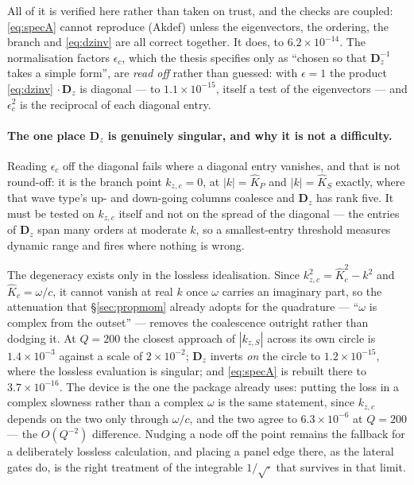 \documentclass[11pt,a4paper]{article}
\begin{document}
All of it is verified here rather than taken on trust, and the checks are
coupled: \eqref{eq:specA} cannot reproduce (Akdef) unless the
eigenvectors, the ordering, the branch and \eqref{eq:dzinv} are all correct
together.  It does, to $6.2\times10^{-14}$.  The normalisation factors
$\epsilon_c$, which the thesis specifies only as ``chosen so that
$\mathbf{D}_z^{-1}$ takes a simple form'', are \emph{read off} rather than
guessed: with $\epsilon=1$ the product \eqref{eq:dzinv}$\,\cdot\mathbf{D}_z$ is
diagonal --- to $1.1\times10^{-15}$, itself a test of the eigenvectors --- and
$\epsilon_c^2$ is the reciprocal of each diagonal entry.

\paragraph{The one place $\mathbf{D}_z$ is genuinely singular, and why it is not
a difficulty.}  Reading $\epsilon_c$ off the diagonal fails where a diagonal
entry vanishes, and that is not round-off: it is the branch point $k_{z,c} = 0$,
at $|k| = \hat K_P$ and $|k| = \hat K_S$ exactly, where that wave type's up- and
down-going columns coalesce and $\mathbf{D}_z$ has rank five.  It must be tested
on $k_{z,c}$ itself and not on the spread of the diagonal --- the entries of
$\mathbf{D}_z$ span many orders at moderate $k$, so a smallest-entry threshold
measures dynamic range and fires where nothing is wrong.

The degeneracy exists only in the lossless idealisation.  Since
$k_{z,c}^2 = \hat K_c^2 - k^2$ and $\hat K_c = \omega/c$, it cannot vanish at
real $k$ once $\omega$ carries an imaginary part, so the attenuation that
\S\ref{sec:propmom} already adopts for the quadrature --- ``$\omega$ is complex
from the outset'' --- removes the coalescence outright rather than dodging it.
At $Q = 200$ the closest approach of $|k_{z,S}|$ across its own circle is
$1.4\times10^{-3}$ against a scale of $2\times10^{-2}$; $\mathbf{D}_z$ inverts
\emph{on} the circle to $1.2\times10^{-15}$, where the lossless evaluation is
singular; and \eqref{eq:specA} is rebuilt there to $3.7\times10^{-16}$.  The
device is the one the package already uses: putting the loss in a complex
slowness rather than a complex $\omega$ is the same statement, since $k_{z,c}$
depends on the two only through $\omega/c$, and the two agree to
$6.3\times10^{-6}$ at $Q = 200$ --- the $O(Q^{-2})$ difference.  Nudging a node
off the point remains the fallback for a deliberately lossless calculation, and
placing a panel edge there, as the lateral gates do, is the right treatment of
the integrable $1/\sqrt{\cdot}$ that survives in that limit.
\end{document}
